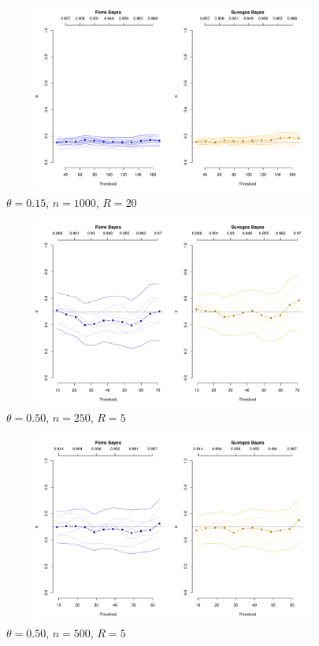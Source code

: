 \documentclass[12pt]{article}
\begin{document}
\begin{figure}
\begin{center}
\includegraphics[width=5.5in, height=2.45in]{../extremal_comparison/figs/sim_frechet_hier_15_1000_20.pdf}
\caption{$\theta=0.15$, $n=1000$, $R=20$}
\end{center}
\end{figure}







\newpage

\begin{figure}
\begin{center}
\includegraphics[width=5.5in, height=2.45in]{../extremal_comparison/figs/sim_frechet_hier_50_250_5.pdf}
\caption{$\theta=0.50$, $n=250$, $R=5$}
\end{center}
\end{figure}

\begin{figure}
\begin{center}
\includegraphics[width=5.5in, height=2.45in]{../extremal_comparison/figs/sim_frechet_hier_50_500_5.pdf}
\caption{$\theta=0.50$, $n=500$, $R=5$}
\end{center}
\end{figure}
\end{document}

